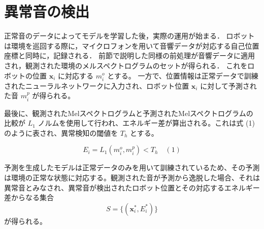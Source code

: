 \documentclass[../main]{subfiles}
\begin{document}
\section{異常音の検出}
正常音のデータによってモデルを学習した後，実際の運用が始まる．
ロボットは環境を巡回する際に，マイクロフォンを用いて音響データが対応する自己位置座標と同時に，記録される．
前節で説明した同様の前処理が音響データに適用され，観測された環境のメルスペクトログラムのセットが得られる．
これをロボットの位置 $\mathbf{x}_i$ に対応する $m_i^o$ とする。
一方で、位置情報は正常データで訓練されたニューラルネットワークに入力され、ロボット位置 $\mathbf{x}_i$ に対して予測された音 $m_i^p$ が得られる。

最後に、観測されたMelスペクトログラムと予測されたMelスペクトログラムの比較が $L_1$ ノルムを使用して行われ、エネルギー差が算出される。これは式 (1) のように表され、異常検知の閾値を $T_h$ とする。

\begin{equation}
    E_i = L_1(m_i^o, m_i^p) < T_h \quad (1)
\end{equation}

予測を生成したモデルは正常データのみを用いて訓練されているため、その予測は環境の正常な状態に対応する。観測された音が予測から逸脱した場合、それは異常音とみなされ、異常音が検出されたロボット位置とその対応するエネルギー差からなる集合
\[
S = \{ (\mathbf{x}_i^*, E_i^*) \}
\]
が得られる。

\label{sec:pmethod_preprocessing}
\end{document}
